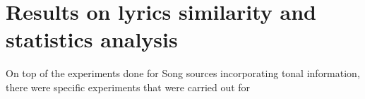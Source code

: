 \section{Results on lyrics similarity and statistics analysis}

\noindent On top of the experiments done for Song sources incorporating tonal information, there were specific experiments that were carried out for 